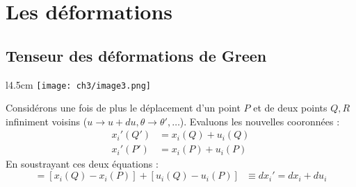        
      
      
      
      
\section{Les déformations}
    
    \subsection{Tenseur des déformations de Green}
    \begin{wrapfigure}[9]{l}{4.5cm}
    \texttt{[image: ch3/image3.png]}
    \end{wrapfigure}
    Considérons une fois de plus le déplacement d'un point $P$ et de deux points $Q,R$ infiniment
     voisins ($u \rightarrow u+du, \theta \rightarrow \theta', \dots$). Evaluons les nouvelles 
     cooronnées :
     \begin{equation}
     \begin{array}{ll}
     x_i'(Q') &= x_i(Q) + u_i(Q) \\
     x_i'(P') &= x_i(P) + u_i(P) 
     \end{array}
     \end{equation}
     En soustrayant ces deux équations :
     \begin{equation}
     [x_i'(Q') - x_i'(P')] = [x_i(Q)-x_i(P)]+[u_i(Q) - u_i(P)]\ \ \ \equiv dx_i' = dx_i + du_i
     \end{equation}
     

